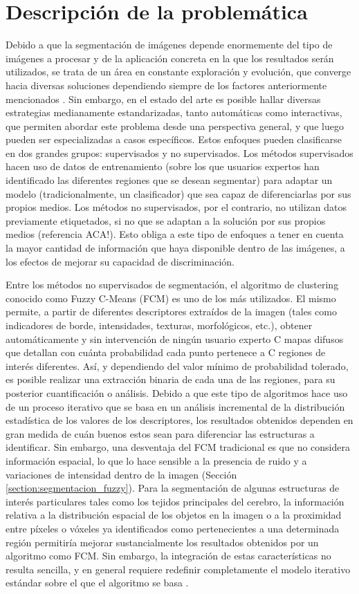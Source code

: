 \section{Descripción de la problemática}
Debido a que la segmentación de imágenes depende enormemente del tipo de imágenes a procesar y de la aplicación concreta en la que los resultados serán utilizados, se trata de un área en constante exploración y evolución, que converge hacia diversas soluciones dependiendo siempre de los factores anteriormente mencionados \citep{bankman2008handbook}. Sin embargo, en el estado del arte es posible hallar diversas estrategias medianamente estandarizadas, tanto automáticas como interactivas, que permiten abordar este problema desde una perspectiva general, y que luego pueden ser especializadas a casos específicos. Estos enfoques pueden clasificarse en dos grandes grupos: supervisados y no supervisados. Los métodos supervisados hacen uso de datos de entrenamiento (sobre los que usuarios expertos han identificado las diferentes regiones que se desean segmentar) para adaptar un modelo (tradicionalmente, un clasificador) que sea capaz de diferenciarlas por sus propios medios. Los métodos no supervisados, por el contrario, no utilizan datos previamente etiquetados, si no que se adaptan a la solución por sus propios medios (referencia ACA!). Esto obliga a este tipo de enfoques a tener en cuenta la mayor cantidad de información que haya disponible dentro de las imágenes, a los efectos de mejorar su capacidad de discriminación.

Entre los métodos no supervisados de segmentación, el algoritmo de clustering conocido como Fuzzy C-Means (FCM) es uno de los más utilizados. El mismo permite, a partir de diferentes descriptores extraídos  de la imagen (tales como indicadores de borde, intensidades, texturas, morfológicos, etc.), obtener automáticamente y sin intervención de ningún usuario experto C mapas difusos que detallan con cuánta probabilidad cada punto pertenece a C regiones de interés diferentes. Así, y dependiendo del valor mínimo de probabilidad tolerado, es posible realizar una extracción binaria de cada una de las regiones, para su posterior cuantificación o análisis. Debido a que este tipo de algoritmos hace uso de un proceso iterativo que se basa en un análisis incremental de la distribución estadística de los valores de los descriptores, los resultados obtenidos dependen en gran medida de cuán buenos estos sean para diferenciar las estructuras a identificar. Sin embargo, una desventaja del FCM tradicional es que no considera información espacial, lo que lo hace sensible a la presencia de ruido y a variaciones de intensidad dentro de la imagen (Sección \ref{section:segmentacion_fuzzy}). Para la segmentación de algunas estructuras de interés particulares tales como los tejidos principales del cerebro, la información relativa a la distribución espacial de los objetos en la imagen o a la proximidad entre píxeles o vóxeles ya identificados como pertenecientes a una determinada región permitiría mejorar sustancialmente los resultados obtenidos por un algoritmo como FCM. Sin embargo, la integración de estas características no resulta sencilla, y en general requiere redefinir completamente el modelo iterativo estándar sobre el que el algoritmo se basa \citep{wang2010fast}.

